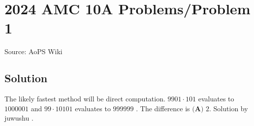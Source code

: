 \documentclass[12pt]{article}
\begin{document}
\section*{{2024 AMC 10A Problems/Problem 1}}
Source: AoPS Wiki

\subsection*{Solution}
The likely fastest method will be direct computation. $9901\cdot101$ evaluates to $1000001$ and $99\cdot10101$ evaluates to $999999$ . The difference is $\boxed{\textbf{(A) }2}.$ Solution by juwushu .
\end{document}

